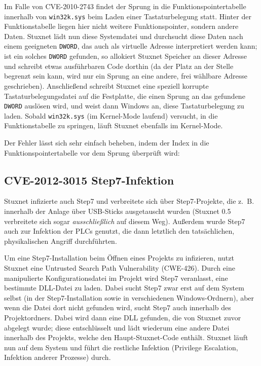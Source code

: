 \documentclass[a4paper]{article}
\begin{document}
Im Falle von CVE-2010-2743 findet der Sprung in die Funktionspointertabelle innerhalb von \texttt{win32k.sys} beim Laden einer Tastaturbelegung statt.
Hinter der Funktionstabelle liegen hier nicht weitere Funktionspointer, sondern andere Daten.
Stuxnet lädt nun diese Systemdatei und durchsucht diese Daten nach einem geeigneten \texttt{DWORD}, das auch als virtuelle Adresse interpretiert werden kann;
ist ein solches \texttt{DWORD} gefunden, so allokiert Stuxnet Speicher an dieser Adresse und schreibt etwas ausführbaren Code dorthin
(da der Platz an der Stelle begrenzt sein kann, wird nur ein Sprung an eine andere, frei wählbare Adresse geschrieben).
Anschließend schreibt Stuxnet eine speziell korrupte Tastaturbelegungsdatei auf die Festplatte, die einen Sprung an das gefundene \texttt{DWORD} auslösen wird,
und weist dann Windows an, diese Tastaturbelegung zu laden.
Sobald \texttt{win32k.sys} (im Kernel-Mode laufend) versucht, in die Funktionstabelle zu springen,
läuft Stuxnet ebenfalls im Kernel-Mode.

Der Fehler lässt sich sehr einfach beheben, indem der Index in die Funktionspointertabelle vor dem Sprung überprüft wird:



\subsection{CVE-2012-3015 Step7-Infektion}

Stuxnet infizierte auch Step7 und verbreitete sich über Step7-Projekte,
die z.~B. innerhalb der Anlage über USB-Sticks ausgetauscht wurden
(Stuxnet 0.5 verbreitete sich sogar \emph{ausschließlich} auf diesem Weg).
Außerdem wurde Step7 auch zur Infektion der PLCs genutzt, die dann letztlich den tatsächlichen, physikalischen Angriff durchführten.

Um eine Step7-Installation beim Öffnen eines Projekts zu infizieren, nutzt Stuxnet eine Untrusted Search Path Vulnerability (CWE-426\cite{cwe_searchpath}).
Durch eine manipulierte Konfigurationsdatei im Projekt wird Step7 veranlasst, eine bestimmte DLL-Datei zu laden.
Dabei sucht Step7 zwar erst auf dem System selbst (in der Step7-Installation sowie in verschiedenen Windows-Ordnern), %
aber wenn die Datei dort nicht gefunden wird, sucht Step7 auch innerhalb des Pro\-jekt\-ord\-ners.
Dabei wird dann eine DLL gefunden, die von Stuxnet zuvor abgelegt wurde;
diese entschlüsselt und lädt wiederum eine andere Datei innerhalb des Projekts, welche den Haupt-Stuxnet-Code enthält.
Stuxnet läuft nun auf dem System und führt die restliche Infektion (Privilege Escalation, Infektion anderer Prozesse) durch.
\end{document}
